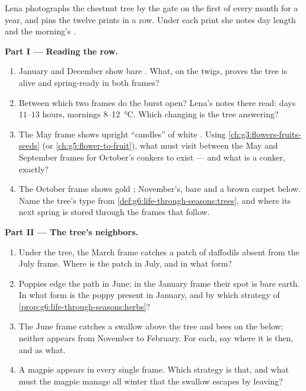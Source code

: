 \begin{problem}\label{pb:g6:life-through-seasons:1}
Lena photographs the chestnut tree by the gate on the first
of every month for a year, and pins the twelve prints in a
row. Under each print she notes day length and the morning's
.

\medskip\noindent\textbf{Part I --- Reading the row.}
\begin{enumerate}
  \item January and December show bare . What, on
        the twigs, proves the tree is alive and spring-ready
        in both frames?
  \item Between which two frames do the  burst open?
        Lena's notes there read: days
        $11$--$13$ hours, mornings
        $8$--\qty{12}{\degreeCelsius}. Which changing
         is the tree answering?
  \item The May frame shows upright ``candles'' of white
        . Using \cref{ch:g3:flowers-fruits-seeds} (or
        \cref{ch:g5:flower-to-fruit}), what must visit
        between the May and September frames for October's
        conkers to exist --- and what is a conker, exactly?
  \item The October frame shows gold ; November's,
        bare  and a brown carpet below. Name the
        tree's type from
        \cref{def:g6:life-through-seasons:trees}, and
        where its next spring is stored through the frames
        that follow.
\end{enumerate}

\medskip\noindent\textbf{Part II --- The tree's neighbors.}
\begin{enumerate}[resume]
  \item Under the tree, the March frame catches a patch of
        daffodils absent from the July frame. Where is the
        patch in July, and in what form?
  \item Poppies edge the path in June; in the January frame
        their spot is bare earth. In what form is the poppy
        present in January, and by which strategy of
        \cref{prop:g6:life-through-seasons:herbs}?
  \item The June frame catches a swallow above the tree and
        bees on the  below; neither appears from
        November to February. For each, say where it is
        then, and as what.
  \item A magpie appears in every single frame. Which
         strategy is that, and what must the magpie
        manage all winter that the swallow escapes by
        leaving?
\end{enumerate}


\end{problem}

